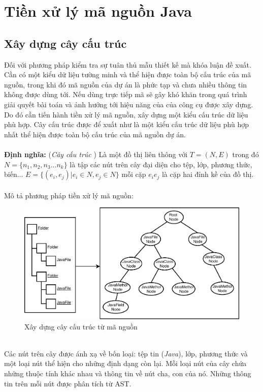 \documentclass[12pt]{report}
\begin{document}
\section{Tiền xử lý mã nguồn Java}
\subsection{Xây dựng cây cấu trúc}
Đối với phương pháp kiểm tra sự tuân thủ mẫu thiết kế mà khóa luận đề xuất. Cần có một kiểu dữ liệu tường minh và thể hiện được toàn bộ cấu trúc của mã nguồn, trong khi đó mã nguồn của dự án là phức tạp và chưa nhiều thông tin không được dùng tới. Nếu dùng trực tiếp mã sẽ gây khó khăn trong quá trình giải quyết bài toán và ảnh hưởng tới hiệu năng của của công cụ được xây dựng. Do đó cần tiến hành tiền xử lý mã nguồn, xây dựng một kiểu cấu trúc dữ liệu phù hợp. Cây cấu trúc được để xuất như là một kiểu cấu trúc dữ liệu phù hợp nhất thể hiện được toàn bộ cấu trúc của mã nguồn dự án.
\\
\\
\textbf{Định nghĩa: }(\textit{Cây cấu trúc} \cite{jcia}) Là một đồ thị liên thông với $T = (N,E)$ trong đó $N = \{n_1,n_2,n_3...n_k \}$ là tập các nút trên cây đại diện cho tệp, lớp, phương thức, biến... $E = \{(e_i,e_j) | e_i \in N , e_j \in N \}$ mỗi cặp $e_ie_j$ là cặp hai đỉnh kề của đồ thị.\\\\
Mô tả phương pháp tiền xử lý mã nguồn:
\begin{figure}[h]
	\centering
	\includegraphics[scale=0.32]{images/structure_tree}
	\caption{Xây dựng cây cấu trúc từ mã nguồn}
	\label{fig:universe}
\end{figure}\\
Các nút trên cây được ánh xạ về bốn loại: tệp tin (\textit{Java}), lớp, phương thức và một loại nút thể hiện cho những định dạng còn lại. Mỗi loại nút của cây chứa những thuộc tính khác nhau và thông tin về nút cha, con của nó. Những thông tin trên mỗi nút được phân tích từ AST.
\end{document}
